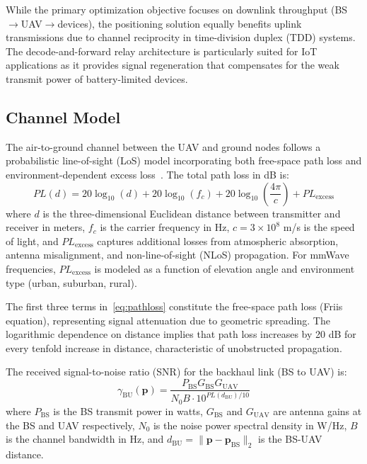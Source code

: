 \documentclass[journal]{IEEEtran}
\begin{document}
While the primary optimization objective focuses on downlink throughput (BS$\to$UAV$\to$devices), the positioning solution equally benefits uplink transmissions due to channel reciprocity in time-division duplex (TDD) systems. The decode-and-forward relay architecture is particularly suited for IoT applications as it provides signal regeneration that compensates for the weak transmit power of battery-limited devices.

\subsection{Channel Model}

The air-to-ground channel between the UAV and ground nodes follows a probabilistic line-of-sight (LoS) model incorporating both free-space path loss and environment-dependent excess loss~\cite{alhourani2014}. The total path loss in dB is:
\begin{equation}
PL(d) = 20\log_{10}(d) + 20\log_{10}(f_c) + 20\log_{10}\left(\frac{4\pi}{c}\right) + PL_{\text{excess}}
\label{eq:pathloss}
\end{equation}
where $d$ is the three-dimensional Euclidean distance between transmitter and receiver in meters, $f_c$ is the carrier frequency in Hz, $c = 3 \times 10^8$ m/s is the speed of light, and $PL_{\text{excess}}$ captures additional losses from atmospheric absorption, antenna misalignment, and non-line-of-sight (NLoS) propagation. For mmWave frequencies, $PL_{\text{excess}}$ is modeled as a function of elevation angle and environment type (urban, suburban, rural).

The first three terms in~\eqref{eq:pathloss} constitute the free-space path loss (Friis equation), representing signal attenuation due to geometric spreading. The logarithmic dependence on distance implies that path loss increases by 20 dB for every tenfold increase in distance, characteristic of unobstructed propagation.

The received signal-to-noise ratio (SNR) for the backhaul link (BS to UAV) is:
\begin{equation}
\gamma_{\text{BU}}(\mathbf{p}) = \frac{P_{\text{BS}} G_{\text{BS}} G_{\text{UAV}}}{N_0 B \cdot 10^{PL(d_{\text{BU}})/10}}
\label{eq:snr_bu}
\end{equation}
where $P_{\text{BS}}$ is the BS transmit power in watts, $G_{\text{BS}}$ and $G_{\text{UAV}}$ are antenna gains at the BS and UAV respectively, $N_0$ is the noise power spectral density in W/Hz, $B$ is the channel bandwidth in Hz, and $d_{\text{BU}} = \|\mathbf{p} - \mathbf{p}_{\text{BS}}\|_2$ is the BS-UAV distance.
\end{document}
